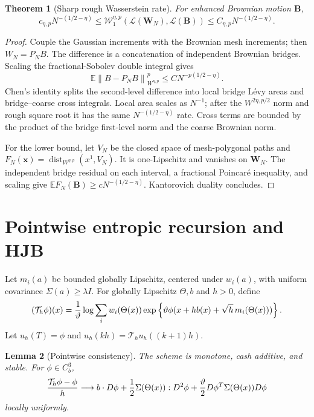 \documentclass[11pt,reqno]{amsart}
\newtheorem{theorem}{Theorem}[section]
\newtheorem{lemma}[theorem]{Lemma}
\theoremstyle{definition}
\theoremstyle{remark}
\newcommand{\E}{\mathbb E}
\newcommand{\dist}{\operatorname{dist}}
\newcommand{\norm}[1]{\left\lVert #1\right\rVert}
\begin{document}
\begin{theorem}[Sharp rough Wasserstein rate]\label{thm:rate}
For enhanced Brownian motion $\mathbf B$,
\[
 c_{\eta,p}N^{-(1/2-\eta)}
 \le\mathcal W_1^{\eta,p}
 (\mathcal L(\mathbf W_N),\mathcal L(\mathbf B))
 \le C_{\eta,p}N^{-(1/2-\eta)}.
\]
\end{theorem}

\begin{proof}
Couple the Gaussian increments with the Brownian mesh increments; then
$W_N=P_NB$.  The difference is a concatenation of independent Brownian
bridges.  Scaling the fractional-Sobolev double integral gives
\[
 \E\norm{B-P_NB}_{W^{\eta,p}}^p
 \le C N^{-p(1/2-\eta)}.
\]
Chen's identity splits the second-level difference into local bridge L\'evy
areas and bridge--coarse cross integrals.  Local area scales as $N^{-1}$; after
the $W^{2\eta,p/2}$ norm and rough square root it has the same
$N^{-(1/2-\eta)}$ rate.  Cross terms are bounded by the product of the bridge
first-level norm and the coarse Brownian norm.

For the lower bound, let $V_N$ be the closed space of mesh-polygonal paths and
$F_N(\mathbf x)=\dist_{W^{\eta,p}}(x^1,V_N)$.  It is one-Lipschitz and
vanishes on $\mathbf W_N$.  The independent bridge residual on each interval,
a fractional Poincar\'e inequality, and scaling give
$\E F_N(\mathbf B)\ge cN^{-(1/2-\eta)}$.  Kantorovich duality concludes.
\end{proof}

\section{Pointwise entropic recursion and HJB}\label{sec:HJB}
Let $m_i(a)$ be bounded globally Lipschitz, centered under $w_i(a)$, with
uniform covariance $\Sigma(a)\ge\lambda I$.  For globally Lipschitz
$\Theta,b$ and $h>0$, define
\[
 (\mathcal T_h\phi)(x)={1\over\vartheta}\log
 \sum_iw_i(\Theta(x))
 \exp\left\{\vartheta
 \phi(x+h b(x)+\sqrt h\,m_i(\Theta(x)))\right\}.
\]
Let $u_h(T)=\phi$ and $u_h(kh)=\mathcal T_hu_h((k+1)h)$.

\begin{lemma}[Pointwise consistency]\label{lem:consistency}
The scheme is monotone, cash additive, and stable.  For $\phi\in C_b^3$,
\[
 {\mathcal T_h\phi-\phi\over h}\longrightarrow
 b\cdot D\phi+{1\over2}\Sigma(\Theta(x)):D^2\phi
 +{\vartheta\over2}D\phi^T\Sigma(\Theta(x))D\phi
\]
locally uniformly.
\end{lemma}
\end{document}
